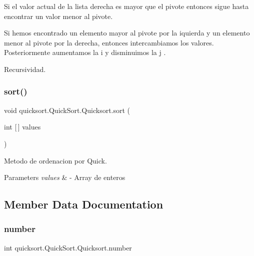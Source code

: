 Si el valor actual de la lista derecha es mayor que el pivote entonces sigue hasta encontrar un valor menor al pivote.

Si hemos encontrado un elemento mayor al pivote por la iquierda y un elemento menor al pivote por la derecha, entonces intercambiamos los valores. Posteriormente aumentamos la i y disminuimos la j .

Recursividad.\hypertarget{classquicksort_1_1_quick_sort_1_1_quicksort_adf33161c7c6f5bab86ad6c4f512f850c}{}\label{classquicksort_1_1_quick_sort_1_1_quicksort_adf33161c7c6f5bab86ad6c4f512f850c} 
\subsubsection{\texorpdfstring{sort()}{sort()}}
{\footnotesize\ttfamily void quicksort.\+Quick\+Sort.\+Quicksort.\+sort (\begin{DoxyParamCaption}\item[{int \mbox{[}$\,$\mbox{]}}]{values }\end{DoxyParamCaption})}



Metodo de ordenacion por Quick. 


\begin{DoxyParams}{Parameters}
{\em values} & -\/ Array de enteros \\
\hline
\end{DoxyParams}


\subsection{Member Data Documentation}
\hypertarget{classquicksort_1_1_quick_sort_1_1_quicksort_a1ccb00d85f76e7150e0746b42038225f}{}\label{classquicksort_1_1_quick_sort_1_1_quicksort_a1ccb00d85f76e7150e0746b42038225f} 
\subsubsection{\texorpdfstring{number}{number}}
{\footnotesize\ttfamily int quicksort.\+Quick\+Sort.\+Quicksort.\+number\hspace{0.3cm}{\ttfamily [private]}}

